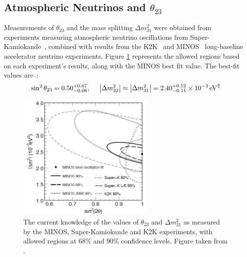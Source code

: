 \subsection{Atmospheric Neutrinos and $\theta_{23}$}
Measurements of $\theta_{23}$ and the mass splitting $\Delta m^2_{31}$ were obtained from experiments measuring atmospheric neutrino oscillations from Super-Kamiokande~\citep{SuperK2006}, combined with results from the K2K~\citep{K2K2006} and MINOS~\citep{MINOS2008} long-baseline accelerator neutrino experiments. Figure \ref{fig:theta_23_confidence} represents the allowed regions based on each experiment's results, along with the MINOS best fit value. The best-fit values are~\citep{Mezzetto2010}:
\begin{equation}\label{eqn:atmospheric_parameters}
\sin^2 \theta_{23} = 0.50^{+0.07}_{-0.06}, ~~~~\left|\Delta m^2_{32} \right| \approx \left| \Delta m^2_{31} \right| = 2.40^{+0.12}_{-0.11} \times 10^{-3} \,\mathrm{eV}^2
\end{equation}

\begin{figure}
\centering
\includegraphics[width=0.6\textwidth]{chapters/neutrinophysics_images/theta_23}
\caption[Allowed region for $\theta_{23}$ and $\Delta m^2_{31}$]{\label{fig:theta_23_confidence}The current knowledge of the values of $\theta_{23}$ and $\Delta m^2_{31}$ as measured by the MINOS, Super-Kamiokande and K2K experiments, with allowed regions at $68\%$ and $90\%$ confidence levels. Figure taken from \citep{PDG2011}.}
\end{figure}

